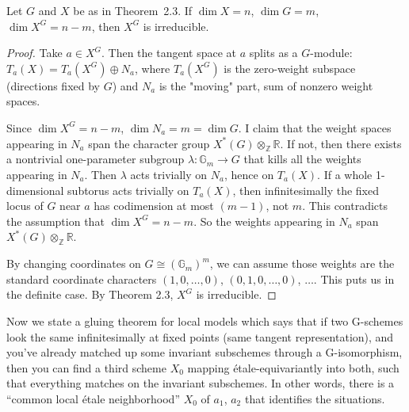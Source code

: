 \documentclass[12pt]{article}
\begin{document}
\begin{corollary}
Let $G$ and $X$ be as in Theorem~2.3. If $\dim X = n$, $\dim G = m$,  $\dim X^G = n-m$, then $X^G$ is irreducible.
\end{corollary}

\begin{proof}
Take $a \in X^G$. Then the tangent space at $a$ splits as a $G$-module:
$T_a(X) = T_a(X^G) \oplus N_a$, where $T_a(X^G)$ is the zero-weight subspace (directions fixed by $G$) and $N_a$ is the "moving" part, sum of nonzero weight spaces.

Since $\dim X^G = n-m$, $\dim N_a = m = \dim G$. I claim that the weight spaces appearing in $N_a$ span the character group $X^*(G)\otimes_\mathbb{Z} \mathbb{R}$. If not, then there exists a nontrivial one-parameter subgroup $\lambda: \mathbb{G}_m \to G$ that kills all the weights appearing in $N_a$. Then $\lambda$ acts trivially on $N_a$, hence on $T_a(X)$. If a whole 1-dimensional subtorus acts trivially on $T_a(X)$, then infinitesimally the fixed locus of $G$ near $a$ has codimension at most $(m-1)$, not $m$. This contradicts the assumption that $\dim X^G = n-m$. So the weights appearing in $N_a$ span $X^*(G)\otimes_\mathbb{Z} \mathbb{R}$.

By changing coordinates on $G \cong (\mathbb{G}_m)^m$, we can assume those weights are the standard coordinate characters $(1,0,\dots,0)$, $(0,1,0,\dots,0)$, $\dots$. This puts us in the definite case. By Theorem 2.3, $X^G$ is irreducible.\end{proof}

Now we state a gluing theorem for local models which says that if two G-schemes look the same infinitesimally at fixed points (same tangent representation), and you’ve already matched up some invariant subschemes through a G-isomorphism, then you can find a third scheme $X_0$ mapping étale-equivariantly into both, such that everything matches on the invariant subschemes. In other words, there is a “common local étale neighborhood” $X_0$ of $a_1$, $a_2$ that identifies the situations.
\end{document}
